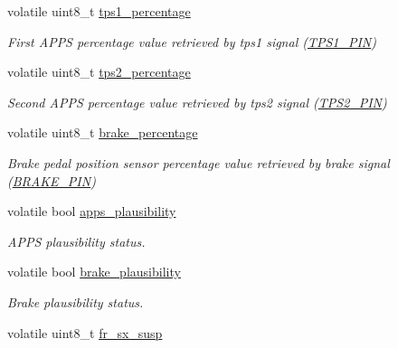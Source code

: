\begin{DoxyCompactItemize}
volatile uint8\+\_\+t \mbox{\hyperlink{group___board__model__group_ga1d42f28ccf027a3243fad064fa47ef81}{tps1\+\_\+percentage}}
\begin{DoxyCompactList}\small\item\em First A\+P\+PS percentage value retrieved by tps1 signal (\mbox{\hyperlink{group___board__pinout__group_gae9aa914854f611488701c96a330b0bd4}{T\+P\+S1\+\_\+\+P\+IN}}) \end{DoxyCompactList}\item 
volatile uint8\+\_\+t \mbox{\hyperlink{group___board__model__group_gaf69d82f83885abc5adbd5fcbf4c421cf}{tps2\+\_\+percentage}}
\begin{DoxyCompactList}\small\item\em Second A\+P\+PS percentage value retrieved by tps2 signal (\mbox{\hyperlink{group___board__pinout__group_gab13a816bae3ca994897fc6f1cb590a67}{T\+P\+S2\+\_\+\+P\+IN}}) \end{DoxyCompactList}\item 
volatile uint8\+\_\+t \mbox{\hyperlink{group___board__model__group_ga8e50a30864da7026531520887968d4c0}{brake\+\_\+percentage}}
\begin{DoxyCompactList}\small\item\em Brake pedal position sensor percentage value retrieved by brake signal (\mbox{\hyperlink{group___board__pinout__group_gad632b56bf4c6259a390c3db91607078e}{B\+R\+A\+K\+E\+\_\+\+P\+IN}}) \end{DoxyCompactList}\item 
volatile bool \mbox{\hyperlink{group___board__model__group_gaa9de48f5a49bc92a608ed315c087f3a6}{apps\+\_\+plausibility}}
\begin{DoxyCompactList}\small\item\em A\+P\+PS plausibility status. \end{DoxyCompactList}\item 
volatile bool \mbox{\hyperlink{group___board__model__group_gae505d69d6ac9d4e7e3c2268ca6cb20b3}{brake\+\_\+plausibility}}
\begin{DoxyCompactList}\small\item\em Brake plausibility status. \end{DoxyCompactList}\item 
\mbox{\label{group___board__model__group_ga90c23c0b7f858714327ef390c73f6424}} 
volatile uint8\+\_\+t \mbox{\hyperlink{group___board__model__group_ga90c23c0b7f858714327ef390c73f6424}{fr\+\_\+sx\+\_\+susp}}

\end{DoxyCompactItemize}
